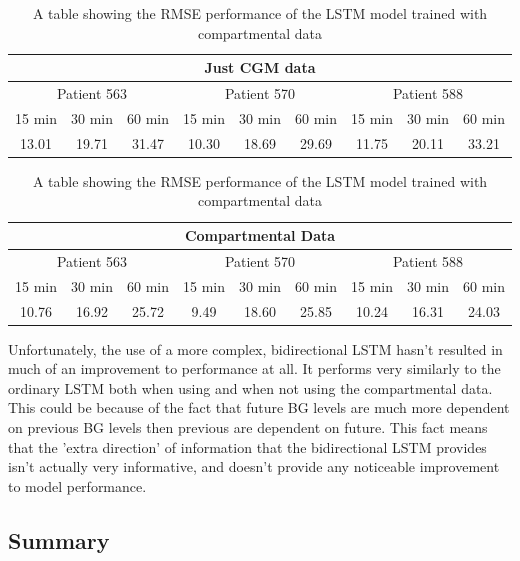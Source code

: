     \begin{table}[H]
      \centering
      \caption{A table showing the RMSE performance of the LSTM model trained with compartmental data}
      \begin{tabular}{|*{9}{c|}} 
        \hline
        \multicolumn{9}{|c|}{Just CGM data} \\ \hline
        \multicolumn{3}{|c}{Patient 563} & \multicolumn{3}{|c}{Patient 570} & \multicolumn{3}{|c|}{Patient 588} \\ \hline 
        15 min & 30 min & 60 min &15 min & 30 min & 60 min &15 min & 30 min & 60 min \\ \hline
        13.01&19.71 &31.47 &10.30 &18.69 & 29.69&11.75 &20.11 &33.21 \\ \hline
      \end{tabular}
      \begin{tabular}{|*{9}{c|}} 
        \hline
        \multicolumn{9}{|c|}{Compartmental Data} \\ \hline
        \multicolumn{3}{|c}{Patient 563} & \multicolumn{3}{|c}{Patient 570} & \multicolumn{3}{|c|}{Patient 588} \\ \hline 
        15 min & 30 min & 60 min &15 min & 30 min & 60 min &15 min & 30 min & 60 min \\ \hline
        10.76 &16.92 &25.72 &9.49 &18.60 &25.85 &10.24&16.31 &24.03 \\ \hline
      \end{tabular}
    \end{table}

    Unfortunately, the use of a more complex, bidirectional LSTM hasn't resulted in much of an improvement to performance at all. It performs very similarly to the ordinary LSTM both when using and when not using the compartmental data. This could be because of the fact that future BG levels are much more dependent on previous BG levels then previous are dependent on future. This fact means that the 'extra direction' of information that the bidirectional LSTM provides isn't actually very informative, and doesn't provide any noticeable improvement to model performance.
	
	\subsection{Summary}
      
